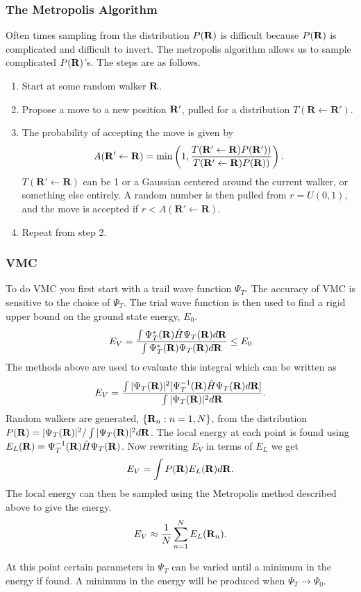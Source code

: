 \subsubsection*{The Metropolis Algorithm}
Often times sampling from the distribution $P(\mathbf{R})$ is difficult because $P(\mathbf{R})$ is complicated and difficult to invert. The metropolis algorithm allows us to sample complicated $P(\mathbf{R})$'s. The steps are as follows.
\begin{enumerate}
  \item Start at some random walker $\mathbf{R}$.
  \item Propose a move to a new position $\mathbf{R}'$, pulled for a distribution $T(\mathbf{R \leftarrow R'})$.
  \item The probability of accepting the move is given by
    \begin{equation}
      A(\mathbf{R' \leftarrow R}) = \mathrm{min}\left( 1, \frac{T(\mathbf{R' \leftarrow R}) P(\mathbf{R}'))}{T(\mathbf{R' \leftarrow R}) P(\mathbf{R}))} \right).
    \end{equation}
    $T(\mathbf{R' \leftarrow R})$ can be 1 or a Gaussian centered around the current walker, or something else entirely. A random number is then pulled from $r=U(0,1)$, and the move is accepted if $r<A(\mathbf{R' \leftarrow R})$.
  \item Repeat from step 2.
\end{enumerate}

\subsubsection*{VMC}
To do VMC you first start with a trail wave function $\Psi_T$. The accuracy of VMC is sensitive to the choice of $\Psi_T$. The trial wave function is then used to find a rigid upper bound on the ground state energy, $E_0$.
\begin{equation}
  E_V = \frac{\int \Psi_T^*(\mathbf{R})\hat{H}\Psi_T(\mathbf{R})d\mathbf{R}}{\int \Psi_T^*(\mathbf{R})\Psi_T(\mathbf{R})d\mathbf{R}} \le E_0
\end{equation}
The methods above are used to evaluate this integral which can be written as
\begin{equation}
  E_V = \frac{\int |\Psi_T(\mathbf{R})|^2 [\Psi_T^{-1}(\mathbf{R})\hat{H}\Psi_T(\mathbf{R})d\mathbf{R}]}{\int |\Psi_T(\mathbf{R})|^2 d\mathbf{R}}.
\end{equation}
Random walkers are generated, $\{\mathbf{R}_n: n=1,N\}$, from the distribution $P(\mathbf{R}) = |\Psi_T(\mathbf{R})|^2/\int|\Psi_T(\mathbf{R})|^2d\mathbf{R}$. The local energy at each point is found using $E_L(\mathbf{R}) = \Psi_T^{-1}(\mathbf{R}) \hat{H} \Psi_T(\mathbf{R})$. Now rewriting $E_V$ in terms of $E_L$ we get
\begin{equation}
  E_V = \int P(\mathbf{R}) E_L(\mathbf{R}) d\mathbf{R}.
\end{equation}
The local energy can then be sampled using the Metropolis method described above to give the energy.
\begin{equation}
  E_V \approx \frac{1}{N} \sum\limits_{n=1}^N E_L({\mathbf{R}_n}).
\end{equation}

At this point certain parameters in $\Psi_T$ can be varied until a minimum in the energy if found. A minimum in the energy will be produced when $\Psi_T \rightarrow \Psi_0$.
